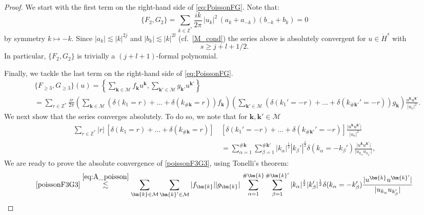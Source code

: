 \documentclass[a4paper,10pt,reqno]{article}
\theoremstyle{definition}
\theoremstyle{plain}
\theoremstyle{plain}
\theoremstyle{definition}
\theoremstyle{plain}
\theoremstyle{plain}
\theoremstyle{plain}
\theoremstyle{definition}
\theoremstyle{definition}
\def \Z{\mathbb Z}
\def \M{\mathcal{M}}
\def \k{\bm{k}}
\begin{document}
\begin{proof}
We start with the first term on the right-hand side of \eqref{eq:PoissonFG}. Note that:
\[
\{ F_2,G_2 \} = \sum_{k \in \Z^*} \frac{ik}{2\pi} \, |u_k|^2 \, (a_k +a_{-k} ) ( b_{-k}+ b_{k} ) =0
\]
by symmetry $k\mapsto -k$. Since $|a_k|\lesssim |k|^{2j}$ and $|b_k|\lesssim |k|^{2l}$ (cf.~\eqref{M_cond}) the series above is absolutely convergent for $u\in \dot{H}^s$ with 
\begin{equation}\label{conds1}
s\geq j+l+1/2.
\end{equation}
In particular, $\{ F_2,G_2 \} $ is trivially a $(j+l+1)$-formal polynomial.

\smallskip

Finally, we tackle the last term on the right-hand side of \eqref{eq:PoissonFG}.
\begin{equation}\label{poissonF3G3}
\begin{split}
& \{ F_{\ge 3},G_{\ge 3} \}(u) = \left \{  \sum_{\k \in \M} f_{\k} u^{\k} ,  \sum_{\k' \in \M} g_{\k'} u^{\k'} \right \} \\
& = \sum_{r \in \Z^*} \frac{ir}{2\pi} \left ( \sum_{\k \in \M} \left ( \delta(k_1=r)+\ldots+\delta(k_{\#\k}=r) \right ) f_{\k} \right ) \left ( \sum_{\k' \in \M} \left ( \delta(k_1'=-r)+\ldots+\delta(k_{\#\k'}'=-r) \right ) g_{\k} \right ) \frac{u^{\k} u^{\k'}}{|u_r|^2}.
\end{split}
\end{equation}
We next show that the series converges absolutely. To do so, we note that for $\k,\k'\in\M$
\begin{equation}\label{eq:A_poisson}
\begin{split}
\sum_{r\in\Z^*} |r|\,  [\delta(k_1=r) + \ldots + \delta(k_{\#\k}=r) ] \, &[\delta(k_1'=-r) + \ldots + \delta(k_{\#\k'}'=-r)] \frac{\lvert u^{\k} u^{\k'} \rvert}{|u_r|^2}\\
& = \sum_{\alpha=1}^{\#\k} \sum_{\beta=1}^{\#\k'} |k_{\alpha}|^{\frac{1}{2}} |k_{\beta}'|^{\frac{1}{2}} \delta(k_{\alpha}=-k_{\beta}') \frac{\lvert u^{\k} u^{\k'} \rvert}{\lvert u_{k_\alpha} u_{k_\beta'} \rvert},
\end{split}
\end{equation}
We are ready to prove the absolute convergence of \eqref{poissonF3G3}, using Tonelli's theorem:
\begin{align}
\eqref{poissonF3G3} & \stackrel{\eqref{eq:A_poisson}}{\lesssim} \sum_{\k \in \M} \sum_{\k' \in \M}  |f_{\k}| |g_{\k}|\,\sum_{\alpha=1}^{\#\k} \sum_{\beta=1}^{\#\k'} |k_{\alpha}|^{\frac{1}{2}} |k_{\beta}'|^{\frac{1}{2}} \delta(k_{\alpha}=-k_{\beta}') \frac{\lvert u^{\k} u^{\k'} \rvert}{\lvert u_{k_\alpha} u_{k_\beta'} \rvert}\nonumber \\

\end{align}
\end{proof}
\end{document}
